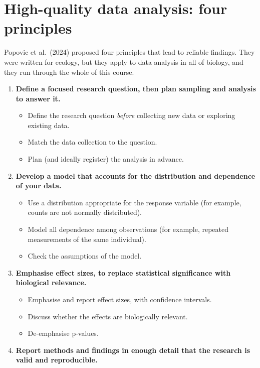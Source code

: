 \documentclass[
  letterpaper,
  8pt,
  a4paper]{book}
\providecommand{\tightlist}{%
  \setlength{\itemsep}{0pt}\setlength{\parskip}{0pt}}
\begin{document}
\section*{High-quality data analysis: four
principles}\label{high-quality-data-analysis-four-principles}


Popovic et al.~(2024) proposed four principles that lead to reliable
findings. They were written for ecology, but they apply to data analysis
in all of biology, and they run through the whole of this course.

\begin{enumerate}
\def\labelenumi{\arabic{enumi}.}
\tightlist
\item
  \textbf{Define a focused research question, then plan sampling and
  analysis to answer it.}

  \begin{itemize}
  \tightlist
  \item
    Define the research question \emph{before} collecting new data or
    exploring existing data.
  \item
    Match the data collection to the question.
  \item
    Plan (and ideally register) the analysis in advance.
  \end{itemize}
\item
  \textbf{Develop a model that accounts for the distribution and
  dependence of your data.}

  \begin{itemize}
  \tightlist
  \item
    Use a distribution appropriate for the response variable (for
    example, counts are not normally distributed).
  \item
    Model all dependence among observations (for example, repeated
    measurements of the same individual).
  \item
    Check the assumptions of the model.
  \end{itemize}
\item
  \textbf{Emphasise effect sizes, to replace statistical significance
  with biological relevance.}

  \begin{itemize}
  \tightlist
  \item
    Emphasise and report effect sizes, with confidence intervals.
  \item
    Discuss whether the effects are biologically relevant.
  \item
    De-emphasise p-values.
  \end{itemize}
\item
  \textbf{Report methods and findings in enough detail that the research
  is valid and reproducible.}


\end{enumerate}
\end{document}
